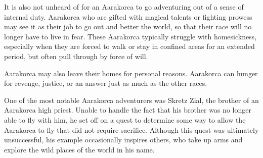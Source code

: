 It is also not unheard of for an Aarakorca to go adventuring out of a sense of internal duty.
Aarakorca who are gifted with magical talents or fighting prowess may see it as their job to go out and better the world, so that their race will no longer have to live in fear.
These Aarakorca typically struggle with homesickness, especially when they are forced to walk or stay in confined areas for an extended period, but often pull through by force of will.

Aarakorca may also leave their homes for personal reasons.
Aarakorca can hunger for revenge, justice, or an answer just as much as the other races.

One of the most notable Aarakorca adventurers was Skretz Zial, the brother of an Aarakorca high priest.
Unable to handle the fact that his brother was no longer able to fly with him, he set off on a quest to determine some way to allow the Aarakorca to fly that did not require sacrifice.
Although this quest was ultimately unsuccessful, his example occasionally inspires others, who take up arms and explore the wild places of the world in his name.